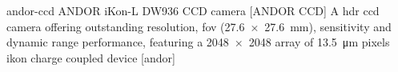 \newglsXequipment%
{andor-ccd}%
{ANDOR iKon{\--}L DW936 CCD camera}%
[ANDOR CCD]%
{A \gls{hdr} \gls{ccd} camera offering outstanding resolution, \gls{fov} (\SI{27.6 x 27.6}{\milli\meter}), sensitivity and dynamic range performance, featuring a \num{2048x2048} array of \SI{13.5}{\micro\meter} pixels}%
{ikon charge coupled device}%
[andor]%